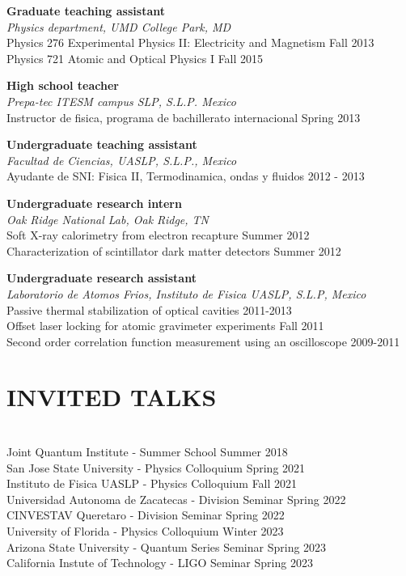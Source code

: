 \documentclass[margin]{res} %
\begin{document}
\begin{resume}
{\bf Graduate teaching assistant} \\
{\it Physics department, UMD College Park, MD}\\
{Physics 276 Experimental Physics II: Electricity and Magnetism} \hfill Fall 2013\\
{Physics 721 Atomic and Optical Physics I} \hfill Fall 2015

{\bf High school teacher} \\
{\it Prepa-tec ITESM campus SLP, S.L.P. Mexico}\\ 
{Instructor de fisica, programa de bachillerato internacional} \hfill Spring 2013

{\bf Undergraduate teaching assistant} \\
{\it Facultad de Ciencias, UASLP, S.L.P., Mexico}\\
{Ayudante de SNI: Fisica II, Termodinamica, ondas y fluidos} \hfill 2012 - 2013

{\bf Undergraduate research intern} \\
{\it Oak Ridge National Lab, Oak Ridge, TN}\\
{Soft X-ray calorimetry from electron recapture} \hfill Summer 2012\\
{Characterization of scintillator dark matter detectors} \hfill Summer 2012

{\bf Undergraduate research assistant} \\
{\it Laboratorio de Atomos Frios, Instituto de Fisica UASLP, S.L.P, Mexico}\\
{Passive thermal stabilization of optical cavities} \hfill 2011-2013\\
{Offset laser locking for atomic gravimeter experiments} \hfill Fall 2011 \\
{Second order correlation function measurement using an oscilloscope} \hfill 2009-2011

\section{INVITED TALKS}
\hfill \\
{Joint Quantum Institute - Summer School \hfill Summer 2018}\\
{San Jose State University - Physics Colloquium \hfill Spring 2021}\\
{Instituto de Fisica UASLP - Physics Colloquium \hfill Fall 2021}\\
{Universidad Autonoma de Zacatecas - Division Seminar \hfill Spring 2022}\\
{CINVESTAV Queretaro - Division Seminar \hfill Spring 2022}\\
{University of Florida - Physics Colloquium \hfill Winter 2023}\\
{Arizona State University - Quantum Series Seminar \hfill Spring 2023}\\
{California Instute of Technology - LIGO Seminar \hfill Spring 2023}

\end{resume}
\end{document}
